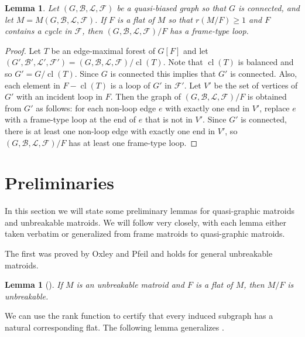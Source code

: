 \documentclass[12pt]{article}
\newtheorem{lemma}[theorem]{Lemma}
\theoremstyle{definition}
\theoremstyle{plain} %
\newcommand{\cB}{\mathcal{B}}
\newcommand{\cF}{\mathcal{F}}
\newcommand{\cL}{\mathcal{L}}
\DeclareMathOperator{\cl}{cl}
\begin{document}
\begin{lemma} \label{lem: at least one frame-type loop}
Let $(G, \cB, \cL, \cF)$ be a quasi-biased graph so that $G$ is connected, and let $M = M(G, \cB, \cL, \cF)$.
If $F$ is a flat of $M$ so that $r(M/F) \ge 1$ and $F$ contains a cycle in $\cF$, then $(G, \cB, \cL, \cF)/F$ has a frame-type loop.
\end{lemma}
\begin{proof}
Let $T$ be an edge-maximal forest of $G[F]$ and let $(G', \cB', \cL', \cF') = (G, \cB, \cL, \cF)/\cl(T)$.
Note that $\cl(T)$ is balanced and so $G' = G/\cl(T)$.
Since $G$ is connected this implies that $G'$ is connected.
Also, each element in $F - \cl(T)$ is a loop of $G'$ in $\cF'$.
Let $V'$ be the set of vertices of $G'$ with an incident loop in $F$.
Then the graph of $(G, \cB, \cL, \cF)/F$ is obtained from $G'$ as follows: for each non-loop edge $e$ with exactly one end in $V'$, replace $e$ with a frame-type loop at the end of $e$ that is not in $V'$.
Since $G'$ is connected, there is at least one non-loop edge with exactly one end in $V'$, so $(G, \cB, \cL, \cF)/F$ has at least one frame-type loop.
\end{proof}



\section{Preliminaries} \label{sec: preliminaries}

In this section we will state some preliminary lemmas for quasi-graphic matroids and unbreakable matroids.
We will follow \cite[Section 2]{Fife-Mayhew-Oxley-Semple2020} very closely, with each lemma either taken verbatim or generalized from frame matroids to quasi-graphic matroids.


The first was proved by Oxley and Pfeil \cite{Oxley-Pfeil2022} and holds for general unbreakable matroids.

\begin{lemma}[{\cite[Lemma 2.1]{Fife-Mayhew-Oxley-Semple2020}}]
If $M$ is an unbreakable matroid and $F$ is a flat of $M$, then $M/F$ is unbreakable.
\end{lemma}






We can use the rank function to certify that every induced subgraph has a natural corresponding flat. The following lemma generalizes \cite[Lemma 2.3]{Fife-Mayhew-Oxley-Semple2020}.
\end{document}
